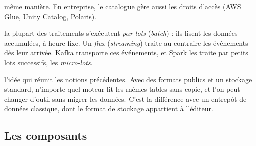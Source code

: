 \documentclass[11pt,a4paper]{article}
\begin{document}
\begin{description}[leftmargin=1.4em,labelindent=0pt,itemsep=4pt,font=\normalfont\bfseries]
  même manière.
  En entreprise, le catalogue gère aussi les droits d'accès (AWS Glue, Unity Catalog, Polaris).
\item[Lots et flux :] la plupart des traitements s'exécutent \emph{par lots} (\emph{batch}) : ils
  lisent les données accumulées, à heure fixe. Un \emph{flux} (\emph{streaming}) traite au contraire
  les événements dès leur arrivée. Kafka transporte ces événements, et Spark les traite par petits
  lots successifs, les \emph{micro-lots}.
\item[Lakehouse ouvert :] l'idée qui réunit les notions précédentes. Avec des formats publics et
  un stockage standard, n'importe quel moteur lit les mêmes tables sans copie, et l'on peut changer
  d'outil sans migrer les données. C'est la différence avec un entrepôt de données classique, dont le
  format de stockage appartient à l'éditeur.
\end{description}

\subsection*{Les composants}
\end{document}

